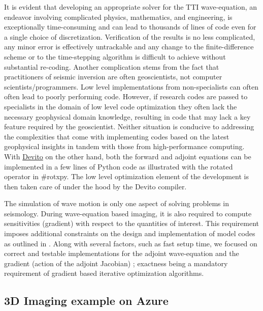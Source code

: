 \documentclass[conference]{IEEEtran}
\begin{document}
It is evident that developing an appropriate solver for the TTI wave-equation,
an endeavor involving complicated physics, mathematics, and engineering, is
exceptionally time-consuming and can lead to thousands of lines of code even for
a single choice of discretization. Verification of the results is no less
complicated, any minor error is effectively untrackable and any change to the
finite-difference scheme or to the time-stepping algorithm is difficult to
achieve without substantial re-coding. Another complication stems from the fact
that practitioners of seismic inversion are often geoscientists, not computer
scientists/programmers. Low level implementations from non-specialists can often
often lead to poorly performing code. However, if research codes are passed to
specialists in the domain of low level code optimization they often lack the
necessary geophysical domain knowledge, resulting in code that may lack a key
feature required by the geoscientist. Neither situation is conducive to
addressing the complexities that come with implementing codes based on the
latest geophysical insights in tandem with those from high-performance
computing. With \href{https://github.com/devitocodes/devito}{Devito} on the other hand, both the forward and adjoint
equations can be implemented in a few lines of Python code as illustrated
with the rotated operator in \#rotxpy. The low level optimization element
of the development is then taken care of under the hood by the Devito
compiler.

The simulation of wave motion is only one aspect of solving problems in
seismology. During wave-equation based imaging, it is also required to compute
sensitivities (gradient) with respect to the quantities of interest. This
requirement imposes additional constraints on the design and implementation of
model codes as outlined in \cite{virieux}. Along with several factors, such as
fast setup time, we focused on correct and testable implementations for the
adjoint wave-equation and the gradient (action of the adjoint Jacobian)
\cite{louboutin2018segeow, louboutin2020THmfi}; exactness being a mandatory
requirement of gradient based iterative optimization algorithms.

\subsection{3D Imaging example on Azure}\label{d-imaging-example-on-azure}
\end{document}
